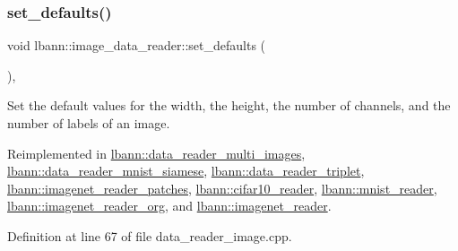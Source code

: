 \subsubsection{\texorpdfstring{set\+\_\+defaults()}{set\_defaults()}}
{\footnotesize\ttfamily void lbann\+::image\+\_\+data\+\_\+reader\+::set\+\_\+defaults (\begin{DoxyParamCaption}{ }\end{DoxyParamCaption})\hspace{0.3cm}{\ttfamily [protected]}, {\ttfamily [virtual]}}



Set the default values for the width, the height, the number of channels, and the number of labels of an image. 



Reimplemented in \hyperlink{classlbann_1_1data__reader__multi__images_a5abe6981d750bc145e50f6141772805c}{lbann\+::data\+\_\+reader\+\_\+multi\+\_\+images}, \hyperlink{classlbann_1_1data__reader__mnist__siamese_a7e1c9530b5d56a0835db8a30af980164}{lbann\+::data\+\_\+reader\+\_\+mnist\+\_\+siamese}, \hyperlink{classlbann_1_1data__reader__triplet_a88bc385a2d42e9f78a768ff496036843}{lbann\+::data\+\_\+reader\+\_\+triplet}, \hyperlink{classlbann_1_1imagenet__reader__patches_a3458e4274b9ed894973a069cf884f04a}{lbann\+::imagenet\+\_\+reader\+\_\+patches}, \hyperlink{classlbann_1_1cifar10__reader_a4c5389d0a6641716c96aa07e58fa4e88}{lbann\+::cifar10\+\_\+reader}, \hyperlink{classlbann_1_1mnist__reader_a5b9a3d56e2d1e1c6820b3c7cc8cde17d}{lbann\+::mnist\+\_\+reader}, \hyperlink{classlbann_1_1imagenet__reader__org_af0d9fc9081013ef0ddd3222dfd9abb8b}{lbann\+::imagenet\+\_\+reader\+\_\+org}, and \hyperlink{classlbann_1_1imagenet__reader_ad1e108315d659509a3e166c2f8a4941f}{lbann\+::imagenet\+\_\+reader}.



Definition at line 67 of file data\+\_\+reader\+\_\+image.\+cpp.


